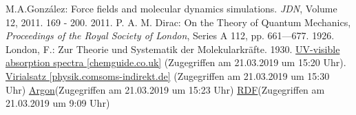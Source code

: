 \documentclass[10pt, a4paper, oneside, twocolumn]{report}
\begin{document}
\begin{thebibliography}{100}
 M.A.González: Force fields and molecular dynamics simulations. \textit{JDN}, Volume 12, 2011. 169 - 200. 2011.
 P. A. M. Dirac: On the Theory of Quantum Mechanics, \textit{Proceedings of the Royal Society of London}, Series A 112, pp. 661—677. 1926.
 London, F.: Zur Theorie und Systematik der Molekularkräfte. 1930. 
  \hyperlink{http://www.chemguide.co.uk/analysis/uvvisible/theory.html}{UV-visible absorption spectra [chemguide.co.uk]} (Zugegriffen am 21.03.2019 um 15:20 Uhr).
 \hyperlink{https://physik.cosmos-indirekt.de/Physik-Schule/Virialsatz}{Virialsatz [physik.comsoms-indirekt.de]} (Zugegriffen am 21.03.2019 um 15:30 Uhr)
 \hyperlink{http://www.sklogwiki.org/SklogWiki/index.php/Argon}{Argon}(Zugegriffen am 21.03.2019 um 15:23 Uhr)
 \hyperlink{https://www.ncbi.nlm.nih.gov/pmc/articles/PMC349093/?page=4}{RDF}(Zugegriffen am 21.03.2019 um 9:09 Uhr)
\end{thebibliography}
\end{document}
